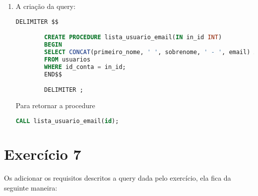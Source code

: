 \documentclass{article}
\begin{document}
\begin{enumerate}[label=\alph*)]
        \item A criação da query:
    \begin{lstlisting}[language=SQL]
        DELIMITER $$

        CREATE PROCEDURE lista_usuario_email(IN in_id INT)
        BEGIN
        SELECT CONCAT(primeiro_nome, ' ', sobrenome, ' - ', email) AS `Nome / e-mail`
        FROM usuarios
        WHERE id_conta = in_id;
        END$$

        DELIMITER ;
    \end{lstlisting}

    Para retornar a procedure

    \begin{lstlisting}[language=SQL]
        CALL lista_usuario_email(id);
    \end{lstlisting}

\end{enumerate}

\section*{Exercício 7}
\paragraph{}Os adicionar os requisitos descritos a query dada pelo exercício, ela fica da seguinte maneira:
\end{document}
